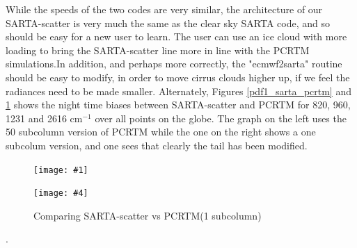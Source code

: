 \documentclass[11pt]{article}
\newcommand{\sa}{\textsf{SARTA}\xspace}
\newcommand{\sasc}{\textsf{SARTA-scatter}\xspace}
\newcommand{\pcrtm}{\textsf{PCRTM}\xspace}
\newcommand{\dfigure}[6]
{
\begin{figure}
  \begin{minipage}[t]{0.45\textwidth}
  \centering
  \texttt{[image: \#1]}
   \caption{#2}  \label{#3}
  \end{minipage}
  \hfil
  \begin{minipage}[t]{0.45\linewidth}
  \centering
  \texttt{[image: \#4]}
   \caption{#5}  \label{#6}
  \end{minipage}
\end{figure}
}
\newcommand{\wn}{cm$^{-1}$\xspace}
\begin{document}
While the speeds of the two codes are very similar, the architecture of our \sasc is very much the same as 
the clear sky \sa code, and so should be easy for a new user to learn. The user can use an ice cloud with 
more loading to bring the \sasc line more in line with the \pcrtm simulations.In addition, and perhaps
more correctly, the "ecmwf2sarta" routine should be easy to modify, in order to move cirrus clouds higher 
up, if we feel the radiances need to be made smaller. Alternately, Figures \ref{pdf1_sarta_pcrtm} and 
\ref{pdf2_sarta_pcrtm} shows the night time biases between \sasc and \pcrtm for 820, 960, 1231 and 2616 \wn
over all points on the globe. The graph on the left uses the 50 subcolumn version of \pcrtm while the one on the right 
shows a one subcolum version, and one sees that clearly the tail has been modified.

\dfigure{Figs/pcrtm_calc_vs_sarta_calc_histV1.jpg}{Comparing \sasc vs \pcrtm (50 subcolumns)}{pdf1_sarta_pcrtm}{Figs/pcrtm_calc_vs_sarta_calc_histV2.jpg}{Comparing \sasc vs \pcrtm (1 subcolumn)}{pdf2_sarta_pcrtm}. 



\end{document}
